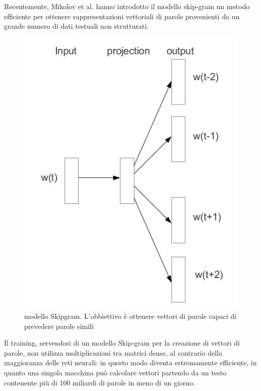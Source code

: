 \documentclass[a4paper,12pt,openright,twoside]{report}
\theoremstyle{definition}
\begin{document}
Recentemente, Mikolov et al. hanno introdotto il modello skip-gram 
un metodo efficiente per ottenere
rappresentazioni vettoriali di parole provenienti da un grande numero di dati testuali non strutturati.

\begin{figure}[h]
	\centering
	\includegraphics[scale=0.4]{Immagini/skipgram.png}
	\caption{modello Skipgram. L'obbiettivo è ottenere vettori di parole capaci di prevedere
	parole simili}
	\label{fig:skipgram}
\end{figure}

Il training, servendosi di un modello Skip-gram  per la creazione di vettori di parole, 
non utilizza moltiplicazioni tra matrici dense, al contrario della maggioranza delle reti 
neurali: in questo modo diventa estremamente efficiente, in quanto una singola macchina può 
calcolare vettori partendo da un testo contenente più di 100 miliardi di parole in meno di un giorno.   
\end{document}
